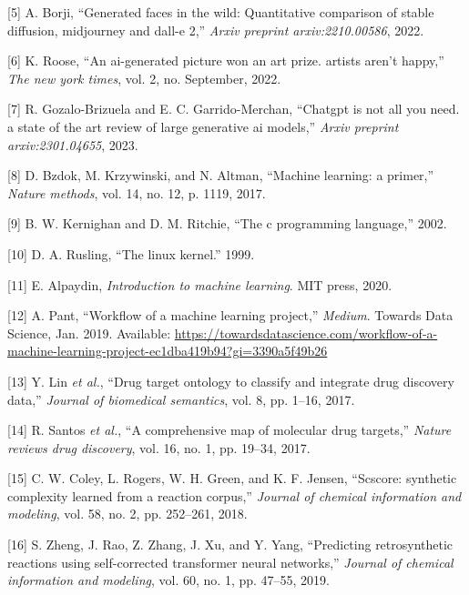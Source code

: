 \documentclass[11pt]{article}
\begin{document}
\hypertarget{citeproc_bib_item_5}{[5] A. Borji, “Generated faces in the wild: Quantitative comparison of stable diffusion, midjourney and dall-e 2,” \textit{Arxiv preprint arxiv:2210.00586}, 2022.}

\hypertarget{citeproc_bib_item_6}{[6] K. Roose, “An ai-generated picture won an art prize. artists aren’t happy,” \textit{The new york times}, vol. 2, no. September, 2022.}

\hypertarget{citeproc_bib_item_7}{[7] R. Gozalo-Brizuela and E. C. Garrido-Merchan, “Chatgpt is not all you need. a state of the art review of large generative ai models,” \textit{Arxiv preprint arxiv:2301.04655}, 2023.}

\hypertarget{citeproc_bib_item_8}{[8] D. Bzdok, M. Krzywinski, and N. Altman, “Machine learning: a primer,” \textit{Nature methods}, vol. 14, no. 12, p. 1119, 2017.}

\hypertarget{citeproc_bib_item_9}{[9] B. W. Kernighan and D. M. Ritchie, “The c programming language,” 2002.}

\hypertarget{citeproc_bib_item_10}{[10] D. A. Rusling, “The linux kernel.” 1999.}

\hypertarget{citeproc_bib_item_11}{[11] E. Alpaydin, \textit{Introduction to machine learning}. MIT press, 2020.}

\hypertarget{citeproc_bib_item_12}{[12] A. Pant, “Workflow of a machine learning project,” \textit{Medium}. Towards Data Science, Jan. 2019. Available: \url{https://towardsdatascience.com/workflow-of-a-machine-learning-project-ec1dba419b94?gi=3390a5f49b26}}

\hypertarget{citeproc_bib_item_13}{[13] Y. Lin \textit{et al.}, “Drug target ontology to classify and integrate drug discovery data,” \textit{Journal of biomedical semantics}, vol. 8, pp. 1–16, 2017.}

\hypertarget{citeproc_bib_item_14}{[14] R. Santos \textit{et al.}, “A comprehensive map of molecular drug targets,” \textit{Nature reviews drug discovery}, vol. 16, no. 1, pp. 19–34, 2017.}

\hypertarget{citeproc_bib_item_15}{[15] C. W. Coley, L. Rogers, W. H. Green, and K. F. Jensen, “Scscore: synthetic complexity learned from a reaction corpus,” \textit{Journal of chemical information and modeling}, vol. 58, no. 2, pp. 252–261, 2018.}

\hypertarget{citeproc_bib_item_16}{[16] S. Zheng, J. Rao, Z. Zhang, J. Xu, and Y. Yang, “Predicting retrosynthetic reactions using self-corrected transformer neural networks,” \textit{Journal of chemical information and modeling}, vol. 60, no. 1, pp. 47–55, 2019.}
\end{document}

